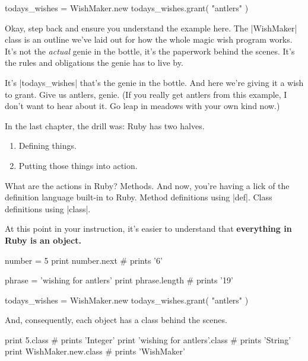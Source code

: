 \documentclass[12pt,twoside]{report}
\begin{document}
\begin{rubycode}

 todays_wishes = WishMaker.new 
 todays_wishes.grant( "antlers" )

\end{rubycode}


Okay, step back and ensure you understand the example here.  The
\rubyinline|WishMaker| class is an outline we've laid
out for how the whole magic wish program works.  It's not the {\em
  actual} genie in the bottle, it's the paperwork behind the scenes.
It's the rules and obligations the genie has to live by.

It's \rubyinline|todays_wishes| that's the genie in
the bottle.  And here we're giving it a wish to grant. Give us
antlers, genie.  (If you really get antlers from this example, I don't
want to hear about it.  Go leap in meadows with your own kind now.)

In the last chapter, the drill was: Ruby has two halves.

\begin{enumerate}
\item Defining things.
\item Putting those things into action.
\end{enumerate}

What are the actions in Ruby?  Methods.  And now, you're having a lick
of the definition language built-in to Ruby.  Method definitions using
\rubyinline|def|.  Class definitions using
\rubyinline|class|.

At this point in your instruction, it's easier to understand that {\bf
  everything in Ruby is an object.}


\begin{rubycode}

 number = 5
 print number.next                  # prints '6'

 phrase = 'wishing for antlers'
 print phrase.length                # prints '19'

 todays_wishes = WishMaker.new
 todays_wishes.grant( "antlers" )

\end{rubycode}


And, consequently, each object has a class behind the scenes.


\begin{rubycode}

 print 5.class                       # prints 'Integer'
 print 'wishing for antlers'.class   # prints 'String'
 print WishMaker.new.class           # prints 'WishMaker'

\end{rubycode}
\end{document}
